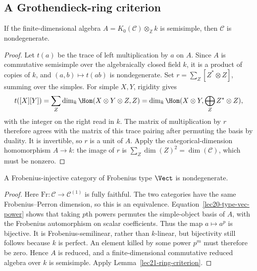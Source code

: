 \subsection{A Grothendieck-ring criterion}
\begin{lemma}\label{lec21-ring-criterion}
If the finite-dimensional algebra
$A=K_0(\mathcal C)\otimes_{\mathbb Z}k$ is semisimple, then
$\mathcal C$ is nondegenerate.
\end{lemma}
\begin{proof}
Let $t(a)$ be the trace of left multiplication by $a$ on $A$.
Since $A$ is commutative semisimple over the algebraically closed field
$k$, it is a product of copies of $k$, and $(a,b)\mapsto t(ab)$ is
nondegenerate. Set $r=\sum_Z[Z^*\otimes Z]$, summing over the simples.
For simple $X,Y$, rigidity gives
\[
 t([X][Y])
 =\sum_Z\dim_k\Hom(X\otimes Y\otimes Z,Z)
 =\dim_k\Hom(X\otimes Y,\bigoplus_Z Z^*\otimes Z),
\]
with the integer on the right read in $k$.
The matrix of multiplication by $r$ therefore agrees with the matrix of
this trace pairing after permuting the basis by duality. It is invertible,
so $r$ is a unit of $A$. Apply the categorical-dimension homomorphism
$A\to k$: the image of $r$ is
$\sum_Z\dim(Z)^2=\dim(\mathcal C)$, which must be nonzero.
\end{proof}

\begin{lemma}\label{lec21-type-vec}
A Frobenius-injective category of Frobenius type $\Vect$ is nondegenerate.
\end{lemma}
\begin{proof}
Here $\mathrm{Fr}:\mathcal C\to\mathcal C^{(1)}$ is fully faithful.
The two categories have the same Frobenius--Perron dimension, so this is
an equivalence. Equation~\eqref{lec20-type-vec-power} shows that taking
$p$th powers permutes the simple-object basis of $A$, with the
Frobenius automorphism on scalar coefficients. Thus the map
$a\mapsto a^p$ is bijective. It is Frobenius-semilinear, rather than
$k$-linear, but bijectivity still follows because $k$ is perfect.
An element killed by some power $p^m$ must therefore be zero. Hence
$A$ is reduced, and a finite-dimensional commutative reduced algebra
over $k$ is semisimple. Apply Lemma~\ref{lec21-ring-criterion}.
\end{proof}

